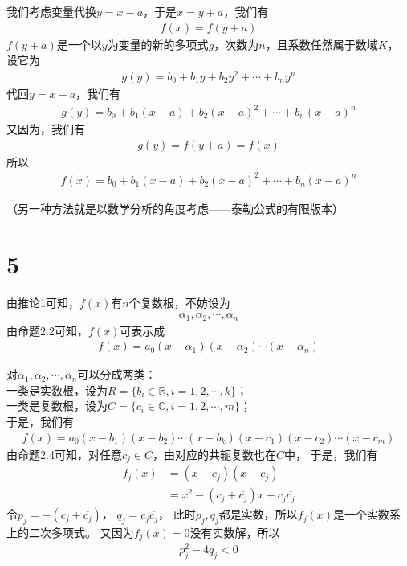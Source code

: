 \documentclass{article}
\begin{document}
我们考虑变量代换$y = x - a$，于是$x = y + a$，我们有
\begin{align*}
  f(x) = f(y + a)
\end{align*}
$f(y + a)$是一个以$y$为变量的新的多项式$g$，次数为$n$，且系数任然属于数域$K$，
设它为
\begin{align*}
  g(y) = b_0 + b_1 y + b_2 y^2 + \cdots + b_{n} y^{n}
\end{align*}
代回$y = x - a$，我们有
\begin{align*}
  g(y) = b_0 + b_1 (x - a) + b_2 (x - a)^2 + \cdots + b_{n} (x - a)^n
\end{align*}
又因为，我们有
\begin{align*}
  g(y) = f(y + a) = f(x)
\end{align*}
所以
\begin{align*}
  f(x) = b_0 + b_1 (x - a) + b_2 (x - a)^2 + \cdots + b_{n} (x - a)^n
\end{align*}

（另一种方法就是以数学分析的角度考虑——泰勒公式的有限版本）

\section*{5}

由推论1可知，$f(x)$有$n$个复数根，不妨设为
\begin{align*}
  \alpha_1, \alpha_2, \cdots, \alpha_n
\end{align*}
由命题2.2可知，$f(x)$可表示成
\begin{align*}
  f(x) = a_0(x - \alpha_1)(x - \alpha_2) \cdots (x - \alpha_n)
\end{align*}

对$\alpha_1, \alpha_2, \cdots, \alpha_n$可以分成两类：\\
一类是实数根，设为$R = \{b_i \in \mathbb{R}, i = 1, 2, \cdots, k\}$；\\
一类是复数根，设为$C = \{c_i \in \mathbb{C}, i = 1, 2, \cdots, m\}$；\\
于是，我们有
\begin{align*}
  f(x) = a_0(x - b_1)(x - b_2) \cdots (x - b_k)(x - c_1)(x - c_2) \cdots (x - c_m)
\end{align*}
由命题2.4可知，对任意$c_j \in C$，由对应的共轭复数也在$C$中，
于是，我们有
\begin{align*}
  f_j(x) & = (x - c_j) (x - \overline{c_j})                    \\
         & = x^2 - (c_j + \overline{c_j})x + c_j\overline{c_j}
\end{align*}
令$p_j = - (c_j + \overline{c_j})$， $q_j = c_j\overline{c_j}$，
此时$p_j, q_j$都是实数，所以$f_j(x)$是一个实数系上的二次多项式。
又因为$f_j(x) = 0$没有实数解，所以
\begin{align*}
  p_j^2 - 4q_j < 0
\end{align*}
\end{document}
